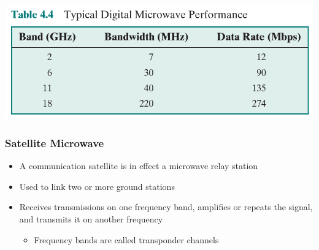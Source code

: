 \documentclass[pdflatex,compress]{beamer}
\begin{document}
\begin{frame}
	\begin{center}
		\includegraphics[width=0.9\linewidth]{img/img19}
	\end{center}
\end{frame}

\begin{frame}
	\frametitle{Satellite Microwave}
	\begin{itemize}
		\item A communication satellite is in effect a microwave relay station
		\item Used to link two or more ground stations
		\item Receives transmissions on one frequency band, amplifies or repeats the signal, and transmits it on another frequency
		\begin{itemize}
			\item Frequency bands are called transponder channels
		\end{itemize}
	\end{itemize}
\end{frame}
\end{document}
